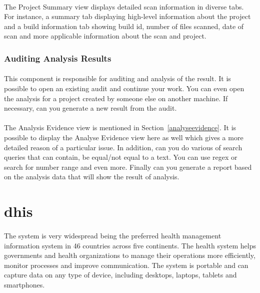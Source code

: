 \documentclass[11pt,english,a4paper]{report}
\begin{document}
\paragraph{}
The Project Summary view displays detailed scan information in diverse tabs.
For instance, a summary tab displaying high-level information about the project and a build information tab showing build id, number of files scanned, date of scan and more applicable information about the scan and project. \cite{installation-usage-guide}

\subsubsection{Auditing Analysis Results}
\paragraph{}
This component is responsible for auditing and analysis of the result.
It is possible to open an existing audit and continue your work.
You can even open the analysis for a project created by someone else on another machine.
If necessary, can you generate a new result from the audit. \cite{installation-usage-guide}

\paragraph{}
The Analysis Evidence view is mentioned in Section~\ref{analyseevidence}. 
It is possible to display the Analyse Evidence view here as well which gives a more detailed reason of a particular issue.
In addition, can you do various of search queries that can contain, be equal/not equal to a text.
You can use \gls{regex} or search for number range and even more. 
Finally can you generate a report based on the analysis data that will show the result of analysis. \cite{installation-usage-guide}


\section{\gls{dhis}}
\paragraph{}
The system is very widespread being the preferred health management information system in 46 countries across five continents. 
The health system helps governments and health organizations to manage their operations more efficiently, monitor processes and improve communication. 
The system is portable and can capture data on any type of device, including desktops, laptops, tablets and smartphones. \cite{dhis2-homepage, dhis2-wiki}
\end{document}
